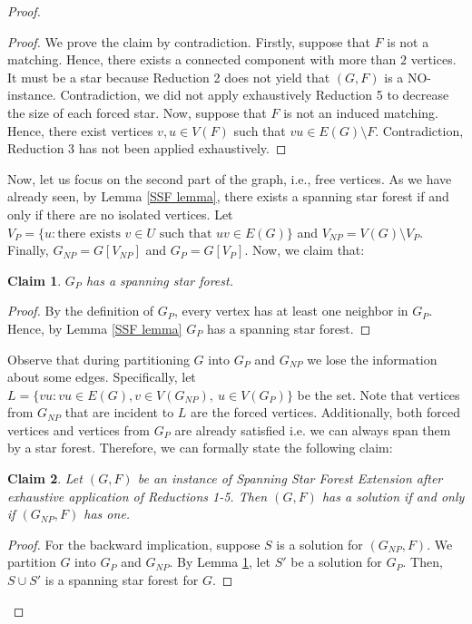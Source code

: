 \documentclass[en]{pracamgr}
\newtheorem{claim}{Claim}
\theoremstyle{definition}
\newcommand{\ssf}{spanning star forest}
\newcommand{\ssfep}{{\sc Spanning Star Forest Extension}}
\begin{document}
\begin{proof}
	\begin{proof}
		We prove the claim by contradiction. Firstly, suppose that $F$ is not a matching. Hence, there exists a connected component with more than $2$ vertices. It must be a star because Reduction 2 does not yield that $(G,F)$ is a NO-instance. Contradiction, we did not apply exhaustively Reduction 5 to decrease the size of each forced star. Now, suppose that $F$ is not an induced matching. Hence, there exist vertices $v,u \in V(F)$ such that $vu \in E(G) \setminus F$. Contradiction, Reduction 3 has not been applied exhaustively.
	\end{proof}

	Now, let us focus on the second part of the graph, i.e., free vertices. As we have already seen, by Lemma \ref{SSF lemma}, there exists a spanning star forest if and only if there are no isolated vertices. Let $V_P = \{u: \text{there exists } v\in U \text{ such that }uv \in E(G)\}$ and $V_{NP} = V(G) \setminus V_P$. Finally, $G_{NP} = G[V_{NP}]$ and $G_P = G[V_P]$. Now, we claim that:

	\begin{claim}\label{GP partition}
		$G_P$ has a spanning star forest.
	\end{claim}
	
	\begin{proof}
		By the definition of $G_P$, every vertex has at least one neighbor in $G_P$. Hence, by Lemma \ref{SSF lemma} $G_P$ has a spanning star forest.
	\end{proof}

	Observe that during partitioning $G$ into $G_P$ and $G_{NP}$ we lose the information about some edges. Specifically, let $L= \{vu: vu \in E(G), v \in V(G_{NP}),\ u \in V(G_P)\}$ be the set. Note that vertices from $G_{NP}$ that are incident to $L$ are the forced vertices. Additionally, both forced vertices and vertices from $G_P$ are already satisfied i.e. we can always span them by a star forest. Therefore, we can formally state the following claim:
	
	\begin{claim}\label{GNP partition}
		Let $(G,F)$ be an instance of \ssfep{} after exhaustive application of Reductions 1-5. Then $(G,F)$ has a solution if and only if $(G_{NP},F)$ has one.
	\end{claim}

	\begin{proof}
		For the backward implication, suppose $S$ is a solution for $(G_{NP},F)$. We  partition $G$ into $G_P$ and $G_{NP}$. By Lemma \ref{GP partition}, let $S'$ be a solution for $G_P$. Then, $S \cup S'$ is a \ssf{} for $G$.
		

\end{proof}
\end{proof}
\end{document}
